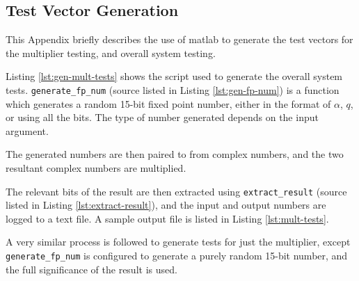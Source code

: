 \clearpage
\begin{appendices}

\section{ Test Vector Generation} \label{app:matlab-code}
This Appendix briefly describes the use of \gls{matlab} to generate the test vectors for the multiplier testing, and overall system testing.

Listing \ref{lst:gen-mult-tests} shows the script used to generate the overall system tests. \texttt{generate\_fp\_num} (source listed in Listing \ref{lst:gen-fp-num}) is a function which generates a random 15-bit fixed point number, either in the format of $\alpha$, $q$, or using all the bits. The type of number generated depends on the input argument.

The generated numbers are then paired to from complex numbers, and the two resultant complex numbers are multiplied.

The relevant bits of the result are then extracted using \texttt{extract\_result} (source listed in Listing \ref{lst:extract-result}), and the input and output numbers are logged to a text file. A sample output file is listed in Listing \ref{lst:mult-tests}.

A very similar process is followed to generate tests for just the multiplier, except \texttt{generate\_fp\_num} is configured to generate a purely random 15-bit number, and the full significance of the result is used.










\end{appendices}